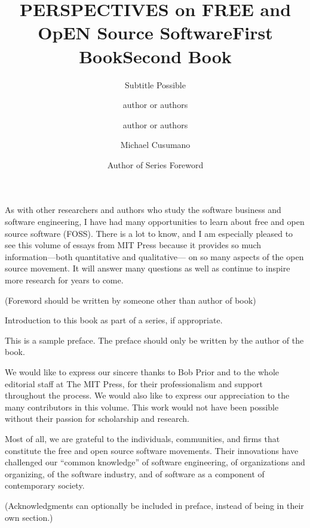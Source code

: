 \documentclass{mitpress}
\title{PERSPECTIVES on FREE and OpEN Source Software}
\subtitle{Subtitle Possible}
\title{First Book}
\author{author or authors}
\title{Second Book}
\author{author or authors}
\begin{document}

\titlepages 


\begin{foreword}
\author{Michael Cusumano}

As with other researchers and authors who study the software business
and software engineering, I have had many opportunities to learn about
free and open source software (FOSS). There is a lot to know, and I am
especially pleased to see this volume of essays from MIT Press because
it provides so much information---both quantitative and qualitative---%
on so many aspects of the open source movement. It will answer many
questions as well as continue to inspire more research for years to
come.


(Foreword should be written by someone other than author of book)
\end{foreword}

\begin{seriesforeword}
\author{Author of Series Foreword}

Introduction to this book as part of a series, if appropriate.
\end{seriesforeword}

\begin{preface}
This is a sample preface. The preface should only
be written by the author of the book.

\end{preface}


\begin{acknowledgment}
We would like to express our sincere thanks to Bob Prior and to the whole
editorial staff at The MIT Press, for their professionalism and support
throughout the process. We would also like to express our appreciation to
the many contributors in this volume. This work would not have been possible
without their passion for scholarship and research.

Most of all, we are grateful to the individuals, communities, and firms
that constitute the free and open source software movements. Their innovations
have challenged our ``common knowledge'' of software engineering,
of organizations and organizing, of the software industry, and of
software as a component of contemporary society.


(Acknowledgments can optionally be included in preface, instead of
being in their own section.)
\end{acknowledgment}
\end{document}
